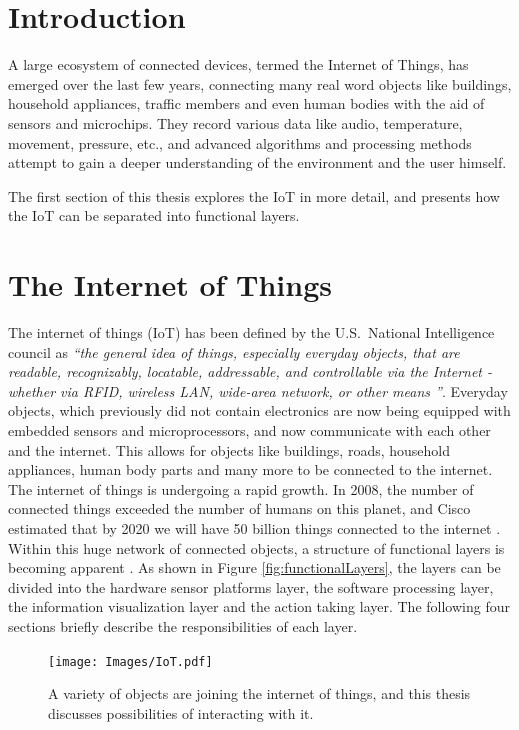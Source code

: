 


\section{Introduction}
\label{sec:introduction}
A large ecosystem of connected devices, termed the Internet of Things, has emerged over the last few years, connecting many real word objects like buildings, household appliances, traffic members and even human bodies with the aid of sensors and microchips.
They record various data like audio, temperature, movement, pressure, etc., and advanced algorithms and processing methods attempt to gain a deeper understanding of the environment and the user himself.

The first section of this thesis explores the IoT in more detail, and presents how the IoT can be separated into functional layers.

\section{The Internet of Things}
\label{sec:internetOfThings}
The internet of things (IoT) has been defined by the U.S.\ National Intelligence council as \emph{``the general idea of things, especially everyday objects, that are readable, recognizably, locatable, addressable, and controllable via the Internet - whether via RFID, wireless LAN, wide-area network, or other means \cite{disruptiveTechnologies}''}.
Everyday objects, which previously did not contain electronics are now being equipped with embedded sensors and microprocessors, and now communicate with each other and the internet. 
This allows for objects like buildings, roads, household appliances, human body parts and many more to be connected to the internet. 
The internet of things is undergoing a rapid growth. 
In 2008, the number of connected things exceeded the number of humans on this planet, and Cisco estimated that by 2020 we will have 50 billion things connected to the internet \cite{evans12}. 
Within this huge network of connected objects, a structure of functional layers is becoming apparent \cite{swan12}. 
As shown in Figure \ref{fig:functionalLayers}, the layers can be divided into the hardware sensor platforms layer, the software processing layer, the information visualization layer and the action taking layer. 
The following four sections briefly describe the responsibilities of each layer.
\begin{figure}[!t]
\centering
\texttt{[image: Images/IoT.pdf]}
\caption{A variety of objects are joining the internet of things, and this thesis discusses possibilities of interacting with it.}
\label{fig:iot}
\end{figure}

